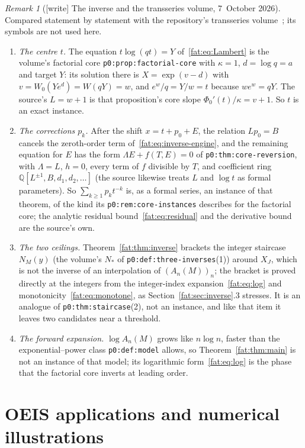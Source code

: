\documentclass[11pt,letterpaper]{article}
\numberwithin{equation}{section}
\newcommand{\file}[1]{\nolinkurl{#1}}
\theoremstyle{remark}\newtheorem{remark}[theorem]{Remark}
\begin{document}
\begin{remark}[{[write]} The inverse and the transseries volume, 7~October 2026]\label{fat:rem:transseries}
Compared statement by statement with the repository's transseries
volume~\cite{TSvol}; its symbols are not used here.
\begin{enumerate}
\item \emph{The centre $t$.} The equation $t\log(qt)=Y$ of~\eqref{fat:eq:Lambert} is the volume's factorial core \file{p0:prop:factorial-core} with $\kappa=1$, $d=\log q=a$ and target $Y$: its solution there is $X=\exp(v-d)$ with $v=W_0(Ye^{d})=W(qY)=w$, and $e^{w}/q=Y/w=t$ because $we^w=qY$. The source's $L=w+1$ is that proposition's core slope $\Phi_0'(t)/\kappa=v+1$. So $t$ is an exact instance.
\item \emph{The corrections $p_k$.} After the shift $x=t+p_0+E$, the relation $Lp_0=B$ cancels the zeroth-order term of~\eqref{fat:eq:inverse-engine}, and the remaining equation for $E$ has the form $\Lambda E+f(T,E)=0$ of \file{p0:thm:core-reversion}, with $\Lambda=L$, $h=0$, every term of $f$ divisible by $T$, and coefficient ring $\mathbb Q[L^{\pm1},B,d_1,d_2,\ldots]$ (the source likewise treats $L$ and $\log t$ as formal parameters). So $\sum_{k\ge1}p_kt^{-k}$ is, as a formal series, an instance of that theorem, of the kind its \file{p0:rem:core-instances} describes for the factorial core; the analytic residual bound~\eqref{fat:eq:residual} and the derivative bound are the source's own.
\item \emph{The two ceilings.} Theorem~\ref{fat:thm:inverse} brackets the integer staircase $N_M(y)$ (the volume's $N_\ast$ of \file{p0:def:three-inverses}(1)) around $X_J$, which is not the inverse of an interpolation of $(A_n(M))_n$; the bracket is proved directly at the integers from the integer-index expansion~\eqref{fat:eq:log} and monotonicity~\eqref{fat:eq:monotone}, as Section~\ref{fat:sec:inverse}.3 stresses. It is an analogue of \file{p0:thm:staircase}(2), not an instance, and like that item it leaves two candidates near a threshold.
\item \emph{The forward expansion.} $\log A_n(M)$ grows like $n\log n$, faster than the exponential--power class \file{p0:def:model} allows, so Theorem~\ref{fat:thm:main} is not an instance of that model; its logarithmic form~\eqref{fat:eq:log} is the phase that the factorial core inverts at leading order.
\end{enumerate}
\end{remark}

\section{OEIS applications and numerical illustrations}\label{fat:sec:applications}
\end{document}
